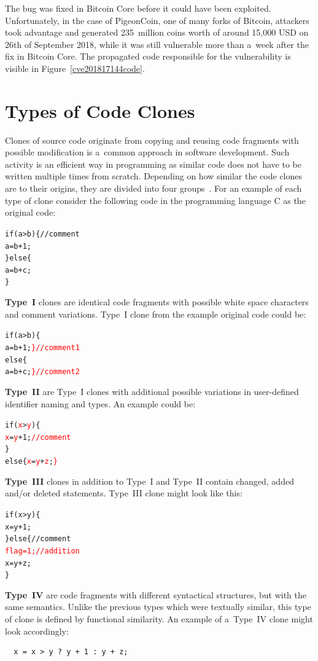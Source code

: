   The bug was fixed in Bitcoin Core before it could have been exploited. Unfortunately, in the case of PigeonCoin,
  one of many forks of Bitcoin, attackers took advantage and generated 235~million coins worth of around 15,000 USD
  on 26th of September 2018, while it was still vulnerable more than a~week after the fix in Bitcoin Core.
  The propagated code responsible for the vulnerability is visible in Figure~\ref{cve201817144code}.~\cite{CoinDeskPGNInflationBug,
  HackerNoonBTCInflationBug}

\section{Types of Code Clones}
  Clones of source code originate from copying and reusing code fragments with possible modification
  is a~common approach in software development. Such activity is an efficient way in programming as similar
  code does not have to be written multiple times from scratch. Depending on how similar the code clones are to
  their origins, they are divided into four groups~\cite{CodeClonesSurvey}. For an example of each type of clone
  consider the following code in the programming language C as the original code:
  \begin{alltt}
  if (a > b) \{  // comment
      a = b + 1;
  \} else \{
      a = b + c;
  \}
  \end{alltt}
  \textbf{Type~I} clones are identical code fragments with possible white space characters and comment
  variations.
  Type~I clone from the example original code could be:
  \begin{alltt}
  if (a > b) \{
      a = b + 1; \textcolor{red}{\}  // comment 1}
  else \{
      a = b + c; \textcolor{red}{\}  // comment 2}
  \end{alltt}
  \textbf{Type~II} are Type~I clones with additional possible variations in user-defined identifier naming
  and types. An example could be:
  \begin{alltt}
  if (\textcolor{red}{x} > \textcolor{red}{y}) \{
      \textcolor{red}{x} = \textcolor{red}{y} + 1;  \textcolor{red}{// comment}
  \}
  else \{ \textcolor{red}{x} = \textcolor{red}{y} + \textcolor{red}{z}; \textcolor{red}{\}}
  \end{alltt}
  \textbf{Type~III} clones in addition to Type~I and Type~II contain changed, added and/or deleted statements.
  Type~III clone might look like this:
  \begin{alltt}
  if (x > y) \{
      x = y + 1;
  \} else \{  // comment
      \textcolor{red}{flag = 1;  // addition}
      x = y + z;
  \}
  \end{alltt}
  \textbf{Type~IV} are code fragments with different syntactical structures, but with the same semantics. Unlike
  the previous types which were textually similar, this type of clone is defined by functional similarity.
  An example of a~Type~IV clone might look accordingly:
  \begin{verbatim}
  x = x > y ? y + 1 : y + z;
  \end{verbatim}

